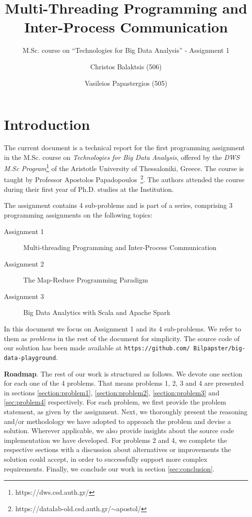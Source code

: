 \documentclass[acmlarge]{acmart}
\begin{document}
\title{Multi-Threading Programming and Inter-Process Communication}
\subtitle{M.Sc. course on ``Technologies for Big Data Analysis'' - Assignment 1}

\author{Christos Balaktsis (506)}
\author{Vasileios Papastergios (505)}

\renewcommand{\shortauthors}{C. Balaktsis and V. Papastergios}
\maketitle

\section{Introduction}

The current document is a technical report for the first programming assignment in the M.Sc. course on \emph{Technologies for Big Data Analysis}, offered by the \emph{DWS M.Sc Program}\footnote{https://dws.csd.auth.gr/} of the Aristotle University of Thessaloniki, Greece. The course is taught by Professor Apostolos Papadopoulos~\footnote{https://datalab-old.csd.auth.gr/$\sim$apostol/}. The authors attended the course during their first year of Ph.D. studies at the Institution.

The assignment contains 4 sub-problems and is part of a series, comprising 3 programming assignments on the following topics:
\begin{description}
  \item[Assignment 1] Multi-threading Programming and Inter-Process Communication
  \item[Assignment 2] The Map-Reduce Programming Paradigm
  \item[Assignment 3] Big Data Analytics with Scala and Apache Spark
\end{description}
In this document we focus on Assignment 1 and its 4 sub-problems. We refer to them as \emph{problems} in the rest of the document for simplicity. The source code of our solution has been made available at \texttt{\small https://github.com/ Bilpapster/big-data-playground}.

\textbf{Roadmap}.
The rest of our work is structured as follows. We devote one section for each one of the 4 problems. That means problems 1, 2, 3 and 4 are presented in sections \ref{section:problem1}, \ref{section:problem2}, \ref{section:problem3} and \ref{sec:problem4} respectively. For each problem, we first provide the problem statement, as given by the assignment. Next, we thoroughly present the reasoning and/or methodology we have adopted to approach the problem and devise a solution. Wherever applicable, we also provide insights about the source code implementation we have developed. For problems 2 and 4, we complete the respective sections with a discussion about alternatives or improvements the solution could accept, in order to successfully support more complex requirements. Finally, we conclude our work in section \ref{sec:conclusion}.
\end{document}
